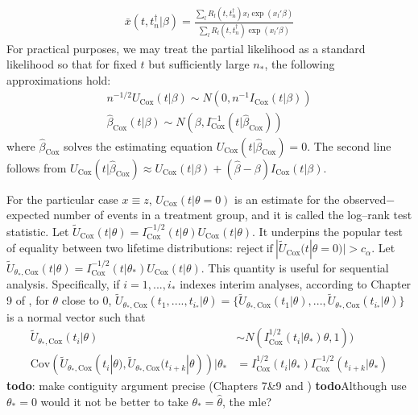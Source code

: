 \documentclass{article}
\newcommand{\interim}{i}
\newcommand{\terminal}{i_*}
\newcommand{\tfail}{t^{\dag}}
\newcommand{\atrisk}{R}
\newcommand{\survfullcov}{x}
\newcommand{\nentry}{n}
\newcommand{\nentries}{n_*}
\newcommand{\treatindic}{z}
\newcommand{\treateffect}{\theta}
\newcommand{\coxscore}{U_{\mathrm{Cox}}}%
\newcommand{\coxscorescaled}{\tilde{U}_{\mathrm{Cox}}}
\newcommand{\coxscorescaledformula}[1]{\coxinfo^{-1/2}(#1)U_{\mathrm{Cox}}(#1)}
\newcommand{\coxscorescaledapprox}[1]{\tilde{U}_{#1,\mathrm{Cox}}}
\newcommand{\coxscorescaledapproxformula}[3]{\coxinfo^{-1/2}(#1|#2)U_{\mathrm{Cox}}(#1|#3)}
\newcommand{\coxinfo}{I_{\mathrm{Cox}}}
\newcommand{\coxsurvfulleffectmle}{\hat{\beta}_{\mathrm{Cox}}}
\newcommand{\survfulleffect}{\beta}
\begin{document}
\begin{align}\label{coxscorecompensator}
\bar \survfullcov(t,\tfail_\nentry|\survfulleffect)=\frac{\sum_l \atrisk_l(t,\tfail_\nentry)\survfullcov_l\exp(\survfullcov_l'\survfulleffect)}{\sum_l \atrisk_l(t,\tfail_\nentry)\exp(\survfullcov_l'\survfulleffect)}
\end{align}For practical purposes, we may treat the partial likelihood as a standard likelihood so that for fixed $t$ but sufficiently large $\nentries$, the following approximations hold: 
\begin{align}\label{coxscoreapprox_1}
n^{-1/2}\coxscore(t|\survfulleffect)\sim N(0,n^{-1}\coxinfo(t|\survfulleffect))\\
\coxsurvfulleffectmle(t|\survfulleffect)\sim N(\survfulleffect,\coxinfo^{-1}(t|\coxsurvfulleffectmle))
\end{align}where $\coxsurvfulleffectmle$ solves the estimating equation $\coxscore(t|\coxsurvfulleffectmle)=0$. The second line follows from $\coxscore(t|\coxsurvfulleffectmle)\approx \coxscore(t|\survfulleffect)+(\hat\survfulleffect-\survfulleffect)\coxinfo(t|\survfulleffect)$.

For the particular case $\survfullcov\equiv\treatindic$, $\coxscore(t|\treateffect=0)$ is an estimate for the  observed$-$expected number of events in a  treatment group, and it is called the log--rank test statistic. Let $\coxscorescaled(t|\treateffect)=\coxscorescaledformula{t|\treateffect}$. It underpins the popular test of equality between two lifetime distributions: $\mathrm{reject\ if\ }|\coxscorescaled(t|\treateffect=0)|>c_\alpha$. Let $\coxscorescaledapprox{\treateffect_*}(t|\treateffect)=\coxscorescaledapproxformula{t}{\treateffect_*}{\treateffect}$. This quantity is useful for sequential analysis. Specifically, if $\interim=1,...,\terminal$ indexes interim analyses, according to Chapter 9 of \cite{Ibrahim2004}, for $\treateffect$ close to $0$, $\coxscorescaledapprox{\treateffect_*}(t_1,....,t_{\terminal}|\treateffect)=\{\coxscorescaledapprox{\treateffect_*}(t_1|\treateffect),...,\coxscorescaledapprox{\treateffect_*}(t_{\terminal}|\treateffect)\}$ is a normal vector such that
\begin{align}\label{coxscorescaledapproxdist}
\coxscorescaledapprox{\treateffect_*}(t_\interim|\treateffect)&\sim N(\coxinfo^{1/2}(t_\interim|\treateffect_*)\treateffect,1))\\\label{coxscorescaledapproxdist2}
\mathrm{Cov}(\coxscorescaledapprox{\treateffect_*}(t_i|\treateffect),\coxscorescaledapprox{\treateffect_*}(t_{i+k}|\treateffect))|\treateffect_*&=\coxinfo^{1/2}(t_\interim|\treateffect_*)\coxinfo^{-1/2}(t_{\interim+k}|\treateffect_*)
\end{align}\textbf{todo}: make contiguity argument precise (Chapters 7\&9\cite{Vaart1998} and \cite{Bilias1997}) \textbf{todo}Although \cite{Ibrahim2004} use $\treateffect_*=0$ would it not be better to take $\treateffect_*=\hat\treateffect$, the mle?
\end{document}
